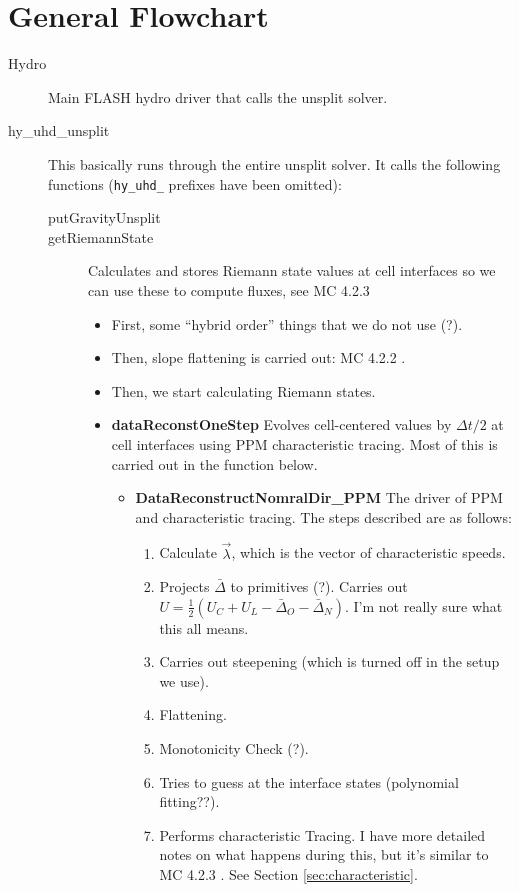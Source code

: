 \documentclass[preprint,11pt]{aastex}
\begin{document}
\section{General Flowchart}
\label{sec:flowchart}
\begin{description}
	\item[Hydro] Main FLASH hydro driver that calls the unsplit solver.
	\item[hy\_uhd\_unsplit] This basically runs through the entire unsplit solver.  It calls the following functions (\verb!hy_uhd_! prefixes have been omitted):
	\begin{description}
		\item[putGravityUnsplit]
		\item[getRiemannState]  Calculates and stores Riemann state values at cell interfaces so we can use these to compute fluxes, see MC 4.2.3
		\begin{itemize}
			\item First, some "`hybrid order"' things that we do not use (?).
			\item Then, slope flattening is carried out: MC 4.2.2 .
			\item Then, we start calculating Riemann states.
			\item \textbf{dataReconstOneStep} Evolves cell-centered values by $\Delta t / 2$ at cell interfaces using PPM characteristic tracing.  Most of this is carried out in the function below.
			\begin{itemize}
				\item \textbf{DataReconstructNomralDir\_PPM} The driver of PPM and characteristic tracing.  The steps described are as follows:
				\begin{enumerate}
					\item Calculate $\vec{\lambda}$, which is the vector of characteristic speeds.
					\item Projects $\bar{\Delta}$ to primitives (?).  Carries out $U = \frac{1}{2} \left( U_C + U_L -\bar{\Delta}_O  - \bar{\Delta}_N \right)$.  I'm not really sure what this all means.
					\item Carries out steepening (which is turned off in the setup we use).
					\item Flattening.
					\item Monotonicity Check (?).
					\item Tries to guess at the interface states (polynomial fitting??).
					\item Performs characteristic Tracing.  I have more detailed notes on what happens during this, but it's similar to MC 4.2.3 .  See Section \ref{sec:characteristic}.

\end{enumerate}
\end{itemize}
\end{itemize}
\end{description}
\end{description}
\end{document}
